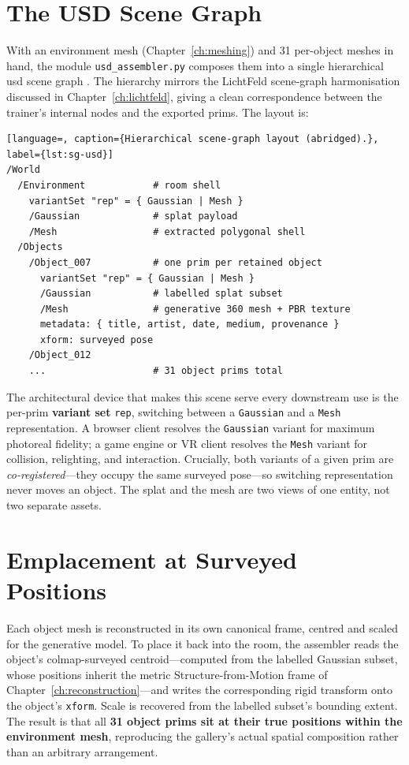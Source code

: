 \section{The USD Scene Graph}
\label{sec:sg-usd}

With an environment mesh (Chapter~\ref{ch:meshing}) and 31 per-object meshes in hand, the module \texttt{usd\_assembler.py} composes them into a single hierarchical \acrshort{usd} scene graph \parencite{Pixar2019}. The hierarchy mirrors the LichtFeld scene-graph harmonisation discussed in Chapter~\ref{ch:lichtfeld}, giving a clean correspondence between the trainer's internal nodes and the exported prims. The layout is:

\begin{lstlisting}[language=, caption={Hierarchical scene-graph layout (abridged).}, label={lst:sg-usd}]
/World
  /Environment            # room shell
    variantSet "rep" = { Gaussian | Mesh }
    /Gaussian             # splat payload
    /Mesh                 # extracted polygonal shell
  /Objects
    /Object_007           # one prim per retained object
      variantSet "rep" = { Gaussian | Mesh }
      /Gaussian           # labelled splat subset
      /Mesh               # generative 360 mesh + PBR texture
      metadata: { title, artist, date, medium, provenance }
      xform: surveyed pose
    /Object_012
    ...                   # 31 object prims total
\end{lstlisting}

The architectural device that makes this scene serve every downstream use is the per-prim \textbf{variant set} \texttt{rep}, switching between a \texttt{Gaussian} and a \texttt{Mesh} representation. A browser client resolves the \texttt{Gaussian} variant for maximum photoreal fidelity; a game engine or VR client resolves the \texttt{Mesh} variant for collision, relighting, and interaction. Crucially, both variants of a given prim are \emph{co-registered}---they occupy the same surveyed pose---so switching representation never moves an object. The splat and the mesh are two views of one entity, not two separate assets.

\section{Emplacement at Surveyed Positions}
\label{sec:sg-emplacement}

Each object mesh is reconstructed in its own canonical frame, centred and scaled for the generative model. To place it back into the room, the assembler reads the object's \acrshort{colmap}-surveyed centroid---computed from the labelled Gaussian subset, whose positions inherit the metric Structure-from-Motion frame of Chapter~\ref{ch:reconstruction}---and writes the corresponding rigid transform onto the object's \texttt{xform}. Scale is recovered from the labelled subset's bounding extent. The result is that all \textbf{31 object prims sit at their true positions within the environment mesh}, reproducing the gallery's actual spatial composition rather than an arbitrary arrangement.

